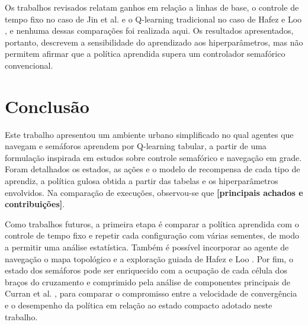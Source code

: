 \documentclass[12pt]{article}
\newcommand{\pendente}[1]{\textbf{[#1]}}
\begin{document}
Os trabalhos revisados relatam ganhos em relação a linhas de base, o controle de tempo fixo no caso de Jin et al.
\cite{Jin2011} e o Q-learning tradicional no caso de Hafez e Loo \cite{Hafez2015}, e nenhuma dessas comparações foi
realizada aqui. Os resultados apresentados, portanto, descrevem a sensibilidade do aprendizado aos hiperparâmetros, mas não
permitem afirmar que a política aprendida supera um controlador semafórico convencional.

\section{Conclusão}\label{sec:conclusao}

Este trabalho apresentou um ambiente urbano simplificado no qual agentes que navegam e semáforos aprendem por Q-learning
tabular, a partir de uma formulação inspirada em estudos sobre controle semafórico e navegação em grade. Foram detalhados os
estados, as ações e o modelo de recompensa de cada tipo de aprendiz, a política gulosa obtida a partir das tabelas e os
hiperparâmetros envolvidos. Na comparação de execuções, observou-se que \pendente{principais achados e contribuições}.

Como trabalhos futuros, a primeira etapa é comparar a política aprendida com o controle de tempo fixo e repetir cada
configuração com várias sementes, de modo a permitir uma análise estatística. Também é possível incorporar ao agente de
navegação o mapa topológico e a exploração guiada de Hafez e Loo \cite{Hafez2015}. Por fim, o estado dos semáforos pode ser
enriquecido com a ocupação de cada célula dos braços do cruzamento e comprimido pela análise de componentes principais de
Curran et al. \cite{Curran2015}, para comparar o compromisso entre a velocidade de convergência e o desempenho da política
em relação ao estado compacto adotado neste trabalho.



\end{document}
